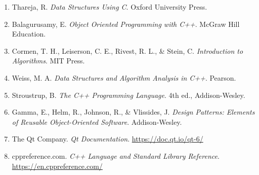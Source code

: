 \documentclass[a4paper,11pt]{article}
\begin{document}
\begin{answerbox}
\begin{enumerate}[leftmargin=19pt,itemsep=2pt,topsep=1pt]
\item Thareja, R. \textit{Data Structures Using C}. Oxford University Press.
\item Balagurusamy, E. \textit{Object Oriented Programming with C++}. McGraw Hill Education.
\item Cormen, T. H., Leiserson, C. E., Rivest, R. L., \& Stein, C. \textit{Introduction to Algorithms}. MIT Press.
\item Weiss, M. A. \textit{Data Structures and Algorithm Analysis in C++}. Pearson.
\item Stroustrup, B. \textit{The C++ Programming Language}. 4th ed., Addison-Wesley.
\item Gamma, E., Helm, R., Johnson, R., \& Vlissides, J. \textit{Design Patterns: Elements of Reusable Object-Oriented Software}. Addison-Wesley.
\item The Qt Company. \textit{Qt Documentation}. \url{https://doc.qt.io/qt-6/}
\item cppreference.com. \textit{C++ Language and Standard Library Reference}. \url{https://en.cppreference.com/}
\end{enumerate}\end{answerbox}
\end{document}
